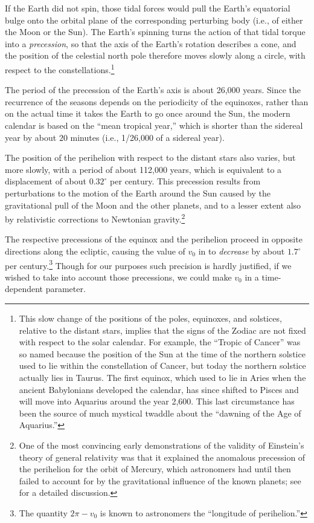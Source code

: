If the Earth did not spin, those tidal forces would pull the Earth's equatorial bulge onto the orbital plane of the corresponding perturbing body (i.e., of either the Moon or the Sun).  The Earth's spinning turns the action of that tidal torque into a \emph{precession}, so that the axis of the Earth's rotation describes a cone, and the position of the celestial north pole therefore moves slowly along a circle, with respect to the constellations.\footnote{This slow change of the positions of the poles, equinoxes, and solstices, relative to the distant stars, implies that the signs of the Zodiac are not fixed with respect to the solar calendar.  For example, the \enquote{Tropic of Cancer} was so named because the position of the Sun at the time of the northern solstice used to lie within the constellation of Cancer, but today the northern solstice actually lies in Taurus.  The first equinox, which used to lie in Aries when the ancient Babylonians developed the calendar, has since shifted to Pisces and will move into Aquarius around the year 2,600.  This last circumstance has been the source of much mystical twaddle about the \enquote{dawning of the Age of Aquarius.}}

The period of the precession of the Earth's axis is about 26,000 years.  Since the recurrence of the seasons depends on the periodicity of the equinoxes, rather than on the actual time it takes the Earth to go once around the Sun, the modern calendar is based on the ``mean tropical year,'' which is shorter than the sidereal year by about $20$ minutes (i.e., 1/26,000 of a sidereal year).

The position of the perihelion with respect to the distant stars also varies, but more slowly, with a period of about 112,000 years, which is equivalent to a displacement of about $0.32^\circ$ per century.  This precession results from perturbations to the motion of the Earth around the Sun caused by the gravitational pull of the Moon and the other planets, and to a lesser extent also by relativistic corrections to Newtonian gravity.\footnote{One of the most convincing early demonstrations of the validity of Einstein's theory of general relativity was that it explained the anomalous precession of the perihelion for the orbit of Mercury, which astronomers had until then failed to account for by the gravitational influence of the known planets; see \cite{dInverno} for a detailed discussion.}

The respective precessions of the equinox and the perihelion proceed in opposite directions along the ecliptic, causing the value of $v_0$ in  to {\it decrease} by about $1.7^\circ$ per century.\footnote{The quantity $2\pi - v_0$ is known to astronomers the ``longitude of perihelion.''}  Though for our purposes such precision is hardly justified, if we wished to take into account those precessions, we could make $v_0$ in  a time-dependent parameter.

